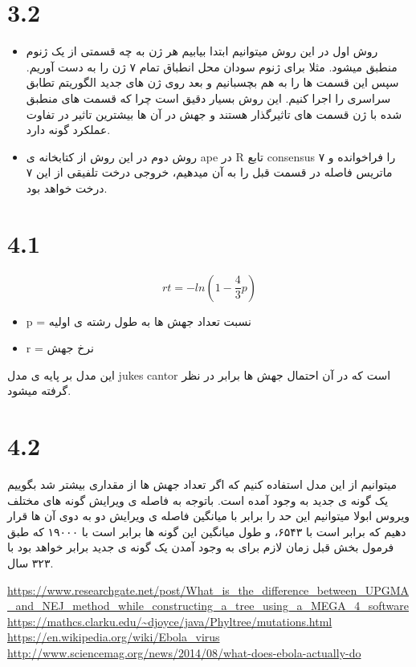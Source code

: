 \documentclass[11pt, oneside]{article}
\begin{document}
\section*{3.2}
\begin{itemize}
\item روش اول
در این روش میتوانیم ابتدا بیابیم هر ژن به چه قسمتی از یک ژنوم منطبق میشود. مثلا برای ژنوم سودان محل انطباق تمام ۷ ژن را به دست آوریم. سپس این قسمت ها را به هم بچسبانیم و بعد روی ژن های جدید الگوریتم تطابق سراسری را اجرا کنیم. این روش بسیار دقیق است چرا که قسمت های منطبق شده با ژن قسمت های تاثیرگذار هستند و جهش در آن ها بیشترین تاثیر در تفاوت عملکرد گونه دارد.
\item روش دوم
در این روش از کتابخانه ی  ape در R تابع consensus را فراخوانده و ۷ ماتریس فاصله در قسمت قبل را به آن میدهیم، خروجی درخت تلفیقی از این ۷ درخت خواهد بود.
\end{itemize}
\section*{4.1}
$$rt = -ln(1- \frac{4}{3}p)$$
\begin{itemize}
\item p = نسبت تعداد جهش ها به طول رشته ی اولیه
\item r = نرخ جهش
\end{itemize}
این مدل بر پایه ی مدل jukes cantor است که در آن احتمال جهش ها برابر در نظر گرفته میشود.
\cite{time}
\section*{4.2}
میتوانیم از این مدل استفاده کنیم که اگر تعداد جهش ها از مقداری بیشتر شد بگوییم یک گونه ی جدید به وجود آمده است. باتوجه به فاصله ی ویرایش گونه های مختلف ویروس ابولا میتوانیم این حد را برابر با میانگین فاصله ی ویرایش دو به دوی آن ها قرار دهیم که برابر است با ۶۵۴۳، و طول میانگین این گونه ها برابر است با ۱۹۰۰۰ که طبق فرمول بخش قبل زمان لازم برای به وجود آمدن یک گونه ی جدید برابر خواهد بود با ۳۲۳ سال.
\newpage
\begin{thebibliography}{1}
\begin{latin}
   {\url{https://www.researchgate.net/post/What_is_the_difference_between_UPGMA_and_NEJ_method_while_constructing_a_tree_using_a_MEGA_4_software}}
   {\url{https://mathcs.clarku.edu/~djoyce/java/Phyltree/mutations.html}}  
   {\url{https://en.wikipedia.org/wiki/Ebola_virus}}  
   {\url{http://www.sciencemag.org/news/2014/08/what-does-ebola-actually-do}}  

\end{latin}
\end{thebibliography}
\end{document}
